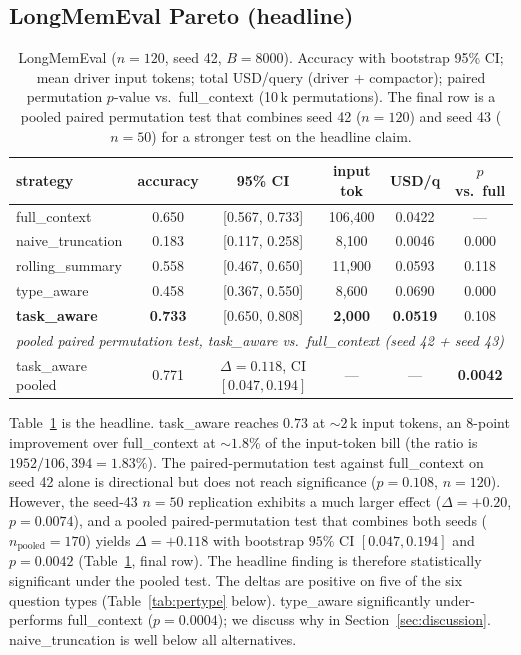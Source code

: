 \documentclass{article}
\begin{document}
\subsection{LongMemEval Pareto (headline)}

\begin{table}[t]
\caption{LongMemEval ($n{=}120$, seed 42, $B{=}8000$). Accuracy with
bootstrap 95\% CI; mean driver input tokens; total USD/query (driver +
compactor); paired permutation $p$-value vs.\ \textsf{full\_context}
(10\,k permutations). The final row is a pooled paired permutation test
that combines seed 42 ($n{=}120$) and seed 43 ($n{=}50$) for a stronger
test on the headline claim.}
\label{tab:lme_main}
\centering
\small
\begin{tabular}{lccccc}
\toprule
strategy & accuracy & 95\% CI & input tok & USD/q & $p$ vs.\ full \\
\midrule
\textsf{full\_context}     & 0.650 & [0.567, 0.733] & 106{,}400 & 0.0422 & --- \\
\textsf{naive\_truncation} & 0.183 & [0.117, 0.258] & 8{,}100   & 0.0046 & 0.000 \\
\textsf{rolling\_summary}  & 0.558 & [0.467, 0.650] & 11{,}900  & 0.0593 & 0.118 \\
\textsf{type\_aware}       & 0.458 & [0.367, 0.550] & 8{,}600   & 0.0690 & 0.000 \\
\textbf{\textsf{task\_aware}} & \textbf{0.733} & [0.650, 0.808] & \textbf{2{,}000} & \textbf{0.0519} & 0.108 \\
\midrule
\multicolumn{6}{l}{\emph{pooled paired permutation test, task\_aware vs.\ full\_context (seed 42 + seed 43)}} \\
\textsf{task\_aware} pooled & 0.771 & $\Delta{=}0.118$, CI $[0.047, 0.194]$ & --- & --- & \textbf{0.0042} \\
\bottomrule
\end{tabular}
\end{table}

Table~\ref{tab:lme_main} is the headline. \textsf{task\_aware} reaches
$0.73$ at $\sim\!2$\,k input tokens, an $8$-point improvement over
\textsf{full\_context} at $\sim\!1.8\%$ of the input-token bill (the
ratio is $1952/106{,}394 = 1.83\%$). The paired-permutation test against
\textsf{full\_context} on seed 42 alone is directional but does not
reach significance ($p{=}0.108$, $n{=}120$). However, the seed-43
$n{=}50$ replication exhibits a much larger effect ($\Delta{=}+0.20$,
$p{=}0.0074$), and a pooled paired-permutation test that combines both
seeds ($n_{\text{pooled}}{=}170$) yields $\Delta{=}+0.118$ with bootstrap
$95\%$ CI $[0.047, 0.194]$ and $p{=}0.0042$ (Table~\ref{tab:lme_main},
final row). The headline finding is therefore statistically significant
under the pooled test. The deltas are positive on five of the six
question types (Table~\ref{tab:pertype} below).
\textsf{type\_aware} significantly under-performs \textsf{full\_context}
($p{=}0.0004$); we discuss why in
Section~\ref{sec:discussion}. \textsf{naive\_truncation} is well below
all alternatives.
\end{document}
